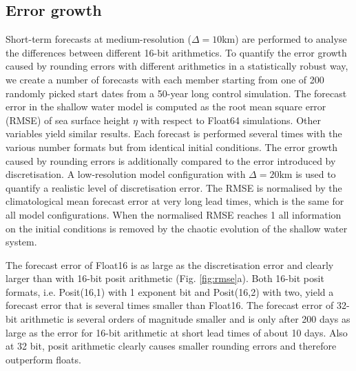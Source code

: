 \subsection{Error growth}

Short-term forecasts at medium-resolution ($\Delta = 10$km) are performed to analyse the differences between
different 16-bit arithmetics. To quantify the error growth caused by rounding errors with different arithmetics in a
statistically robust way, we create a number of forecasts with each member starting from one of 200 randomly picked
start dates from a 50-year long control simulation. The forecast error in the shallow water model is computed as the 
root mean square error (RMSE) of sea surface height $\eta$ with respect to Float64 simulations. Other variables yield
similar results. Each forecast is performed several times with the various number formats but from identical initial conditions.
The error growth caused by rounding errors is additionally compared to the error introduced by discretisation. A low-resolution
model configuration with $\Delta = 20$km is used to quantify a realistic level of discretisation error. The RMSE is normalised
by the climatological mean forecast error at very long lead times, which is the same for all model configurations. When the
normalised RMSE reaches 1 all information on the initial conditions is removed by the chaotic evolution of the shallow water
system.

The forecast error of Float16 is as large as the discretisation error and clearly larger than with 16-bit posit arithmetic (Fig. \ref{fig:rmse}a).
Both 16-bit posit formats, i.e. Posit(16,1) with 1 exponent bit and Posit(16,2) with two, yield a forecast error that is several times smaller
than Float16. The forecast error of 32-bit arithmetic is several orders of magnitude smaller and is only after 200 days as large as the
error for 16-bit arithmetic at short lead times of about 10 days. Also at 32 bit, posit arithmetic clearly causes smaller rounding
errors and therefore outperform floats.

